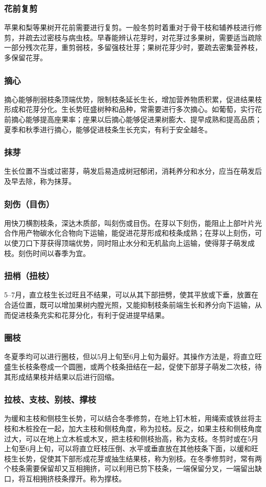 \documentclass{ctexbook}
\begin{document}
\subsubsection{花前复剪}
苹果和梨等果树开花前需要进行复剪。一般冬剪时着重对于骨干枝和辅养枝进行修剪，并疏去过密枝与病虫枝。早春能辨认花芽时，对花芽过多果树，需要适当疏除一部分残次花芽，重剪弱枝，多留强枝壮芽；果树花芽少时，要疏去密集营养枝，多保留花芽。
\subsubsection{摘心}
摘心能够削弱枝条顶端优势，限制枝条延长生长，增加营养物质积累，促进结果枝形成和花芽分化。生长势旺盛树种和品种，常需要进行多次摘心。如葡萄，实行花前摘心能够提高座果率；座果以后摘心能够促进果树膨大、提早成熟和提高品质；夏季和秋季进行摘心，能够促进枝条生长充实，有利于安全越冬。
\subsubsection{抹芽}
生长位置不当或过密芽，萌发后易造成树冠郁闭，消耗养分和水分，应当在萌发后及早去除，称为抹芽。
\subsubsection{刻伤（目伤）}
用快刀横割枝条，深达木质部，叫刻伤或目伤。在芽以下刻伤，能阻止上部叶片光合作用产物碳水化合物向下运输，能促进花芽形成和枝条成熟；在芽以上刻伤，可以使刀口下芽获得顶端优势，同时阻止水分和无机盐向上运输，使得芽子萌发成枝。刻伤时间以春季为宜。
\subsubsection{扭梢（扭枝）}
5--7月，直立枝生长过旺且不结果，可以从其下部扭劈，使其平放或下垂，放置在合适位置，既可以增加果树内膛光照，又能抑制枝条前端生长和养分向下运输，从而促进枝条充实和花芽分化，有利于促进提早结果。
\subsubsection{圈枝}
冬夏季均可以进行圈枝，但以5月上旬至6月上旬为最好。其操作方法是，将直立旺盛生长枝条卷成一个圆圈，或两个枝条扭结在一起，促使下部芽子萌发二次枝，待其形成结果枝并结果以后进行回缩。
\subsubsection{拉枝、支枝、别枝、撑枝}
为缓和主枝和侧枝生长势，可以结合冬季修剪，在地上钉木桩，用绳索或铁丝将主枝和木桩拴在一起，加大主枝和侧枝角度，称为拉枝。反之，如果主枝和侧枝角度过大，可以在地上立木桩或木叉，把主枝和侧枝抬高，称为支枝。冬剪时或在5月上旬至6月上旬，可以将直立旺枝压倒、水平或垂直放在其他枝条下面，以缓和旺枝生长势，促使其下部形成花芽或抽生结果枝，称为别枝。在冬季修剪时，常有两个枝条需要保留却又互相拥挤，可以利用已剪下枝条，一端保留分叉，一端留出缺口，将互相拥挤枝条撑开。称为撑枝。
\end{document}

